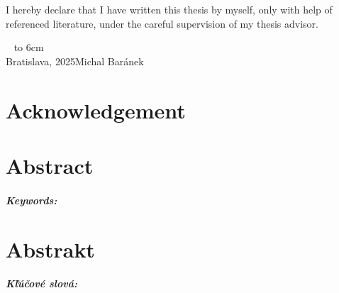 \documentclass[12pt, twoside, openany]{book}
\def\mfauthor{Michal Baránek}
\def\mfplacedate{Bratislava, 2025}
\begin{document}
	\newpage 
	\thispagestyle{empty}
	
	
	
	
	{~}\vspace{12cm}
	
	\noindent
	\begin{minipage}{0.25\textwidth}~\end{minipage}
	\thispagestyle{empty}
	\begin{minipage}{0.75\textwidth}
		I hereby declare that I have written this thesis by myself, only with help of referenced literature, under the careful supervision of my thesis advisor.
		\newline \newline
	\end{minipage}
	\vfill
	~ \hfill {\hbox to 6cm{\dotfill}} \\
	\mfplacedate \hfill \mfauthor
	\vfill\eject \cleardoublepage
	
	
	
	
	\newpage
	\thispagestyle{empty}
	\chapter*{Acknowledgement}\label{chap:thank_you}
	
	
	\vfill\eject 
	
	
	
	\newpage 
	\thispagestyle{empty}
	\chapter*{Abstract}\label{chap:abstract_en}
	
	\paragraph*{Keywords:}  
	
	
	\newpage 
	\thispagestyle{empty}
	\chapter*{Abstrakt}\label{chap:abstract_sk}
	
	\paragraph*{Kľúčové slová:}
	
\end{document}
